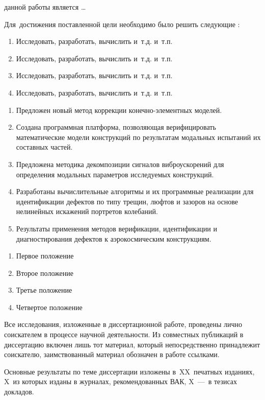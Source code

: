 {\aim} данной работы является \ldots

Для~достижения поставленной цели необходимо было решить следующие {\tasks}:
\begin{enumerate}[beginpenalty = 10000] 
	\item Исследовать, разработать, вычислить и~т.\:д. и~т.\:п.
	\item Исследовать, разработать, вычислить и~т.\:д. и~т.\:п.
	\item Исследовать, разработать, вычислить и~т.\:д. и~т.\:п.
	\item Исследовать, разработать, вычислить и~т.\:д. и~т.\:п.
\end{enumerate}

{\novelty}
\begin{enumerate}[beginpenalty = 10000] 
	\item Предложен новый метод коррекции конечно-элементных моделей. 
	\item Создана программная платформа, позволяющая верифицировать математические модели конструкций по результатам модальных испытаний их составных частей.
	\item Предложена методика декомпозиции сигналов виброускорений для определения модальных параметров исследуемых конструкций.
	\item Разработаны вычислительные алгоритмы и их программные реализации для идентификации дефектов по типу трещин, люфтов и зазоров на основе нелинейных искажений портретов колебаний.
	\item Результаты применения методов верификации, идентификации и диагностирования дефектов к аэрокосмическим конструкциям.
\end{enumerate}

{\influence} 

{\methods} 

{}
\begin{enumerate}[beginpenalty = 10000] 
	\item Первое положение
	\item Второе положение
	\item Третье положение
	\item Четвертое положение
\end{enumerate}

{\reliability} 



{\contribution} 

Все исследования, изложенные в диссертационной работе, проведены лично соискателем в процессе научной
деятельности. Из совместных публикаций в диссертацию включен лишь тот материал, который непосредственно принадлежит соискателю, заимствованный материал обозначен в работе ссылками.

{\pasport}


{\publications} 

Основные результаты по теме диссертации изложены в~XX~печатных изданиях, X~из которых изданы в журналах, рекомендованных ВАК, X~---~в тезисах докладов.
